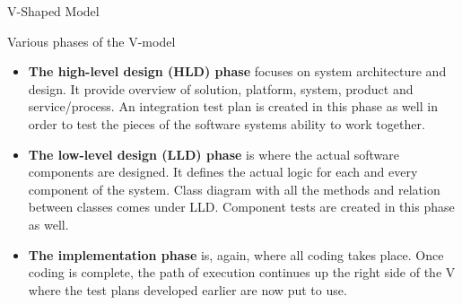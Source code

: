 \documentclass[final,hyperref={pdfpagelabels=false}]{beamer}
\begin{document}
\begin{frame}{V-Shaped Model}
\begin{block}{\large Various phases of the V-model }
\begin{itemize}
            \item \textbf{ The high-level design (HLD) phase} focuses on system architecture and design. It provide overview of solution, platform, system, product and service/process. An integration test plan is created in this phase as well in order to test the pieces of the software systems ability to work together.
            
            \item \textbf{ The low-level design (LLD) phase} is where the actual software components are designed. It defines the actual logic for each and every component of the system. Class diagram with all the methods and relation between classes comes under LLD. Component tests are created in this phase as well.
            
            \item \textbf{ The implementation phase} is, again, where all coding takes place. Once coding is complete, the path of execution continues up the right side of the V where the test plans developed earlier are now put to use.
            

\end{itemize}
\end{block}
\end{frame}
\end{document}
